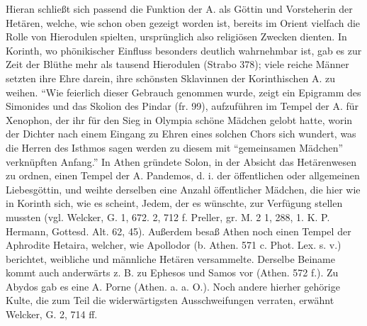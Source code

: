 \documentclass[a4paper, 11pt, oneside]{article}
\begin{document}
Hieran schließt sich passend die Funktion der A. als Göttin und Vorsteherin der Hetären, welche, wie schon oben gezeigt worden ist, bereits im Orient vielfach die Rolle von Hierodulen spielten, ursprünglich also religiösen Zwecken dienten. In Korinth, wo phönikischer Einfluss besonders deutlich wahrnehmbar ist, gab es zur Zeit der Blüthe mehr als tausend Hierodulen (Strabo 378); viele reiche Männer setzten ihre Ehre darein, ihre schönsten Sklavinnen der Korinthischen A. zu weihen. "`Wie feierlich dieser Gebrauch genommen wurde, zeigt ein Epigramm des Simonides und das Skolion des Pindar (fr. 99), aufzuführen im Tempel der A. für Xenophon, der ihr für den Sieg in Olympia schöne Mädchen gelobt hatte, worin der Dichter nach einem Eingang zu Ehren eines solchen Chors sich wundert, was die Herren des Isthmos sagen werden zu diesem mit "`gemeinsamen Mädchen"' verknüpften Anfang."' In Athen gründete Solon, in der Absicht das Hetärenwesen zu ordnen, einen Tempel der A. Pandemos, d. i. der öffentlichen oder allgemeinen Liebesgöttin, und weihte derselben eine Anzahl öffentlicher Mädchen, die hier wie in Korinth sich, wie es scheint, Jedem, der es wünschte, zur Verfügung stellen mussten (vgl. Welcker, G. 1, 672. 2, 712 f. Preller, gr. M. 2 1, 288, 1. K. P. Hermann, Gottesd. Alt. 62, 45). Außerdem besaß Athen noch einen Tempel der Aphrodite Hetaira, welcher, wie Apollodor (b. Athen. 571 c. Phot. Lex. s. v.) berichtet, weibliche und männliche Hetären versammelte. Derselbe Beiname kommt auch anderwärts z. B. zu Ephesos und Samos vor (Athen. 572 f.). Zu Abydos gab es eine A. Porne (Athen. a. a. O.). Noch andere hierher gehörige Kulte, die zum Teil die widerwärtigsten Ausschweifungen verraten, erwähnt Welcker, G. 2, 714 ff.
\end{document}
